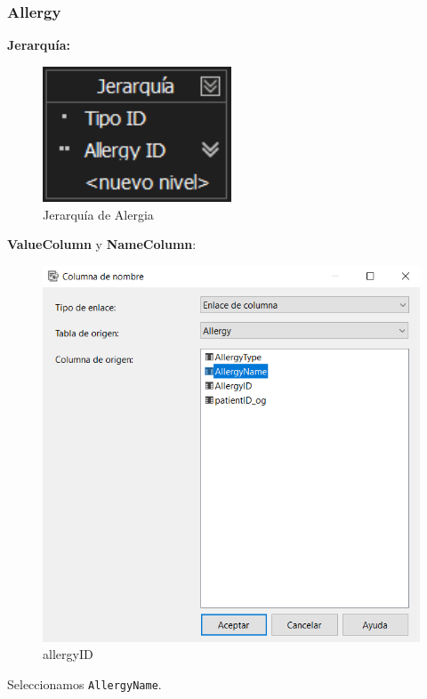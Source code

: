 \documentclass[12pt, a4paper, twoside]{article}
\begin{document}
\subsubsection{Allergy}

\textbf{Jerarquía:}

\begin{figure}[H]
	\centering
	\includegraphics[width=0.5\textwidth]{image/JAlergia}
	\caption{Jerarquía de Alergia}
	\label{fig:18}
\end{figure}

\textbf{ValueColumn} y \textbf{NameColumn}:

\begin{figure}[H]
	\centering
	\includegraphics[width=1\textwidth]{image/allergyID}
	\caption{allergyID}
	\label{fig:19}
\end{figure}

Seleccionamos \texttt{AllergyName}.
\end{document}
